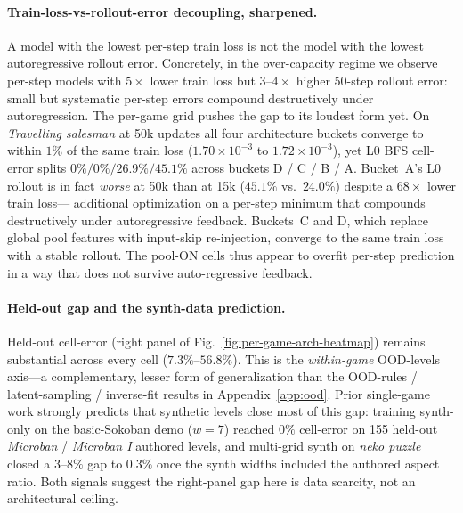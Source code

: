 \paragraph{Train-loss-vs-rollout-error decoupling, sharpened.}
\label{app:F3-sharpened}
A model with the lowest per-step train loss is not the model with the
lowest autoregressive rollout error. Concretely, in the over-capacity
regime we observe per-step models with $5\times$ lower train loss but
$3$--$4\times$ higher 50-step rollout error: small but systematic
per-step errors compound destructively under autoregression. The
per-game grid pushes the gap to its loudest form yet.
On \textit{Travelling salesman} at 50k updates all four architecture
buckets converge to within $1\%$ of the same train loss
($1.70\times 10^{-3}$ to $1.72\times 10^{-3}$), yet L0 BFS cell-error
splits $0\% / 0\% / 26.9\% / 45.1\%$ across buckets D / C / B / A.
Bucket~A's L0 rollout is in fact \emph{worse} at 50k than at 15k
($45.1\%$ vs.\ $24.0\%$) despite a $68\times$ lower train loss---%
additional optimization on a per-step minimum that compounds
destructively under autoregressive feedback. Buckets~C and D, which
replace global pool features with input-skip re-injection, converge to
the same train loss with a stable rollout. The pool-ON cells thus
appear to overfit per-step prediction in a way that does not survive
auto-regressive feedback.

\paragraph{Held-out gap and the synth-data prediction.}
Held-out cell-error (right panel of Fig.~\ref{fig:per-game-arch-heatmap})
remains substantial across every cell ($7.3\%$--$56.8\%$). This is the
\emph{within-game} OOD-levels axis---a complementary, lesser form of
generalization than the OOD-rules / latent-sampling / inverse-fit
results in Appendix~\ref{app:ood}. Prior single-game work strongly
predicts that synthetic levels close most of this gap: training
synth-only on the basic-Sokoban demo ($w{=}7$) reached $0\%$ cell-error
on 155 held-out \textit{Microban} / \textit{Microban I} authored
levels, and multi-grid synth on \textit{neko puzzle} closed a
$3$--$8\%$ gap to $0.3\%$ once the synth widths included the authored
aspect ratio. Both signals suggest the right-panel gap here is data
scarcity, not an architectural ceiling.

